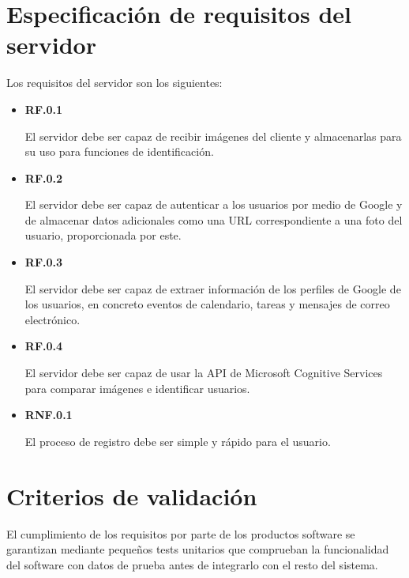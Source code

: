 \section{Especificación de requisitos del servidor}

Los requisitos del servidor son los siguientes:

\begin{itemize}
	\item \textbf{RF.0.1}

	El servidor debe ser capaz de recibir imágenes del cliente y almacenarlas para su uso para funciones de identificación.

	\item \textbf{RF.0.2}

	El servidor debe ser capaz de autenticar a los usuarios por medio de Google y de almacenar datos adicionales como una URL correspondiente a una foto del usuario, proporcionada por este.

	\item \textbf{RF.0.3}

	El servidor debe ser capaz de extraer información de los perfiles de Google de los usuarios, en concreto eventos de calendario, tareas y mensajes de correo electrónico.

	\item \textbf{RF.0.4}

	El servidor debe ser capaz de usar la API de Microsoft Cognitive Services para comparar imágenes e identificar usuarios.

	\item \textbf{RNF.0.1}
	
	El proceso de registro debe ser simple y rápido para el usuario.
	
\end{itemize}

\section{Criterios de validación}

El cumplimiento de los requisitos por parte de los productos software se garantizan mediante pequeños tests unitarios que comprueban la funcionalidad del software con datos de prueba antes de integrarlo con el resto del sistema.